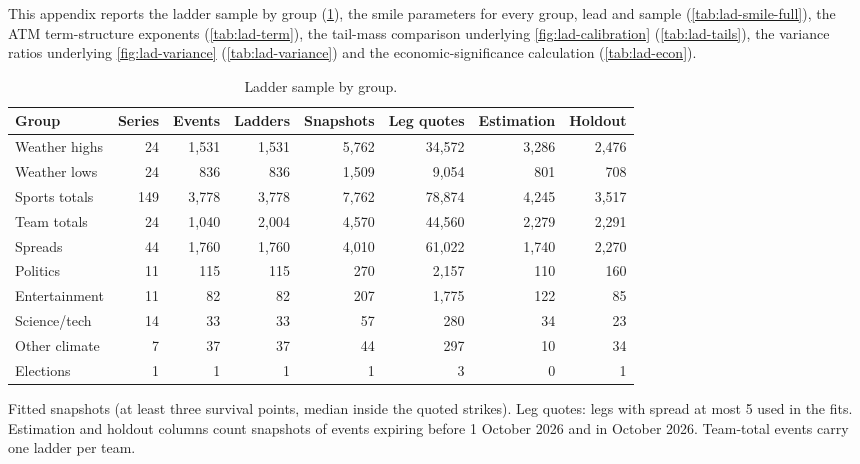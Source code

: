 This appendix reports the ladder sample by group (\cref{tab:lad-sample}), the smile parameters
for every group, lead and sample (\cref{tab:lad-smile-full}), the ATM term-structure exponents
(\cref{tab:lad-term}), the tail-mass comparison underlying \cref{fig:lad-calibration}
(\cref{tab:lad-tails}), the variance ratios underlying \cref{fig:lad-variance}
(\cref{tab:lad-variance}) and the economic-significance calculation (\cref{tab:lad-econ}).

\begin{table}[ht]
\centering\small
\begin{threeparttable}
\caption{Ladder sample by group.}\label{tab:lad-sample}
\begin{tabular}{@{}lrrrrrrr@{}}
\toprule
Group & Series & Events & Ladders & Snapshots & Leg quotes & Estimation & Holdout \\
\midrule
Weather highs & 24 & 1,531 & 1,531 & 5,762 & 34,572 & 3,286 & 2,476 \\
Weather lows & 24 & 836 & 836 & 1,509 & 9,054 & 801 & 708 \\
Sports totals & 149 & 3,778 & 3,778 & 7,762 & 78,874 & 4,245 & 3,517 \\
Team totals & 24 & 1,040 & 2,004 & 4,570 & 44,560 & 2,279 & 2,291 \\
Spreads & 44 & 1,760 & 1,760 & 4,010 & 61,022 & 1,740 & 2,270 \\
Politics & 11 & 115 & 115 & 270 & 2,157 & 110 & 160 \\
Entertainment & 11 & 82 & 82 & 207 & 1,775 & 122 & 85 \\
Science/tech & 14 & 33 & 33 & 57 & 280 & 34 & 23 \\
Other climate & 7 & 37 & 37 & 44 & 297 & 10 & 34 \\
Elections & 1 & 1 & 1 & 1 & 3 & 0 & 1 \\
\bottomrule
\end{tabular}
\begin{tablenotes}[flushleft]\footnotesize
\item Fitted snapshots (at least three survival points, median inside the quoted strikes). Leg
quotes: legs with spread at most 5\cents{} used in the fits. Estimation and holdout columns count
snapshots of events expiring before 1 October 2026 and in October 2026. Team-total events carry
one ladder per team.
\end{tablenotes}
\end{threeparttable}
\end{table}

